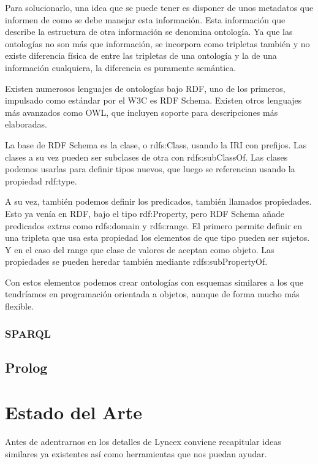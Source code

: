 \documentclass[12pt]{report} %
\begin{document}
Para solucionarlo, una idea que se puede tener es disponer de unos metadatos que informen de como se debe manejar esta información. Esta información que describe la estructura de otra información se denomina ontología. Ya que las ontologías no son más que información, se incorpora como tripletas también y no existe diferencia física de entre las tripletas de una ontología y la de una información cualquiera, la diferencia es puramente semántica. 

Existen numerosos lenguajes de ontologías bajo RDF, uno de los primeros, impulsado como estándar por el W3C es RDF Schema. Existen otros lenguajes más avanzados como OWL, que incluyen soporte para descripciones más elaboradas.

La base de RDF Schema es la clase, o rdfs:Class, usando la IRI con prefijos. Las clases a su vez pueden ser subclases de otra con rdfs:subClassOf. Las clases podemos usarlas para definir tipos nuevos, que luego se referencian usando la propiedad rdf:type.

A su vez, también podemos definir los predicados, también llamados propiedades. Esto ya venía en RDF, bajo el tipo rdf:Property, pero RDF Schema añade predicados extras como rdfs:domain y rdfs:range. El primero permite definir en una tripleta que usa esta propiedad los elementos de que tipo pueden ser sujetos. Y en el caso del range que clase de valores de aceptan como objeto. Las propiedades se pueden heredar también mediante rdfs:subPropertyOf.

Con estos elementos podemos crear ontologías con esquemas similares a los que tendríamos en programación orientada a objetos, aunque de forma mucho más flexible.

\subsection{SPARQL}

\section{Prolog}

\chapter{Estado del Arte}

Antes de adentrarnos en los detalles de Lyncex conviene recapitular ideas similares ya existentes así como herramientas que nos puedan ayudar. 
\end{document}
